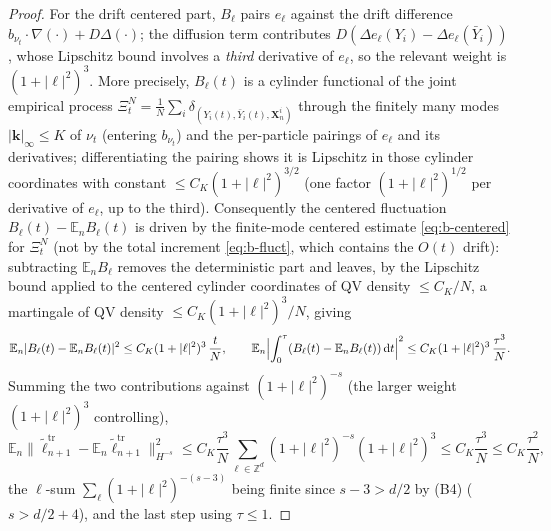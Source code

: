 \documentclass[a4paper,fleqn]{cas-sc}
\theoremstyle{definition}
\theoremstyle{remark}
\begin{document}
\begin{proof}
For the drift centered part, $B_\ell$ pairs $e_\ell$ against the drift
difference $b_{\nu_t}\!\cdot\!\nabla(\cdot)+D\Delta(\cdot)$; the diffusion term
contributes $D(\Delta e_\ell(Y_i)-\Delta e_\ell(\bar Y_i))$, whose Lipschitz
bound involves a \emph{third} derivative of $e_\ell$, so the relevant weight is
$(1+|\ell|^2)^3$. More precisely, $B_\ell(t)$ is a cylinder functional of the
joint empirical process
$\Xi^N_t=\frac1N\sum_i\delta_{(Y_i(t),\bar Y_i(t),\mathbf X^i_n)}$ through the
finitely many modes $|\mathbf k|_\infty\le K$ of $\nu_t$ (entering $b_{\nu_t}$) and
the per-particle pairings of $e_\ell$ and its derivatives; differentiating the
pairing shows it is Lipschitz in those cylinder coordinates with constant
$\le C_K(1+|\ell|^2)^{3/2}$ (one factor $(1+|\ell|^2)^{1/2}$ per derivative of
$e_\ell$, up to the third). Consequently the centered fluctuation
$B_\ell(t)-\mathbb E_nB_\ell(t)$ is driven by the finite-mode centered estimate
\eqref{eq:b-centered} for $\Xi^N_t$ (not by the total increment
\eqref{eq:b-fluct}, which contains the $O(t)$ drift): subtracting
$\mathbb E_nB_\ell$ removes the deterministic part and leaves, by the Lipschitz
bound applied to the centered cylinder coordinates of QV density $\le C_K/N$, a
martingale of QV density $\le C_K(1+|\ell|^2)^3/N$, giving
\[
\mathbb E_n|B_\ell(t)-\mathbb E_nB_\ell(t)|^2\le C_K(1+|\ell|^2)^3\,\frac tN,
\qquad
\mathbb E_n\Bigl|\int_0^\tau(B_\ell(t)-\mathbb E_nB_\ell(t))\,\mathrm dt\Bigr|^2
\le C_K(1+|\ell|^2)^3\,\frac{\tau^3}{N}.
\]
Summing the two contributions against $(1+|\ell|^2)^{-s}$ (the larger weight
$(1+|\ell|^2)^3$ controlling),
\[
\mathbb E_n\|\tilde\ell^{\mathrm{tr}}_{n+1}-\mathbb E_n\tilde\ell^{\mathrm{tr}}_{n+1}\|_{H^{-s}}^2
\le C_K\frac{\tau^3}{N}\sum_{\ell\in\mathbb Z^d}(1+|\ell|^2)^{-s}(1+|\ell|^2)^3
\le C_K\frac{\tau^3}{N}\le C_K\frac{\tau^2}{N},
\]
the $\ell$-sum $\sum_\ell(1+|\ell|^2)^{-(s-3)}$ being finite since $s-3>d/2$ by
(B4) ($s>d/2+4$), and the last step using $\tau\le1$.


\end{proof}
\end{document}
